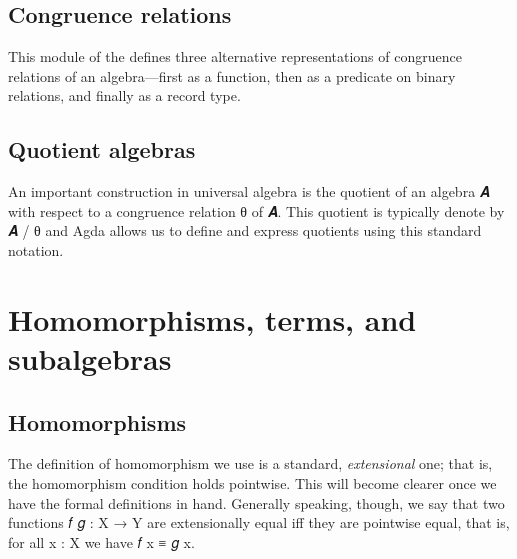 \documentclass[a4paper,UKenglish,cleveref,autoref,thm-restate]{lipics-v2021}
\begin{document}
\subsection{Congruence relations}\label{ssec:congr-relat}
This \ualibCongruences module of the \agdaualib defines 
three alternative representations of congruence relations of an algebra---first as a function, then as a predicate on binary relations, and finally as a record type.
\ccpad
\begin{code}%
  
\end{code}







\subsection{Quotient algebras}\label{ssec:quotient-algebras}
An important construction in universal algebra is the quotient of an algebra \ab 𝑨 with respect to a congruence relation \ab θ of \ab 𝑨. This quotient is typically denote by \ab 𝑨 \as / \ab θ and Agda allows us to define and express quotients using this standard notation.
\ccpad
\begin{code}%
  
\end{code}







\section{Homomorphisms, terms, and subalgebras}\label{sec:homom-terms-subalg}

\subsection{Homomorphisms}\label{ssec:homomorphisms}

The definition of homomorphism we use is a standard, \emph{extensional} one; that is, the homomorphism condition holds pointwise. This will become clearer once we have the formal definitions in hand. Generally speaking, though, we say that two functions \ab 𝑓 \ab 𝑔 \as : \ab X \as → \ab Y are extensionally equal iff they are pointwise equal, that is, for all \ab x \as : \ab X we have \ab 𝑓 \ab x \af ≡ \ab 𝑔 \ab x.
\end{document}
